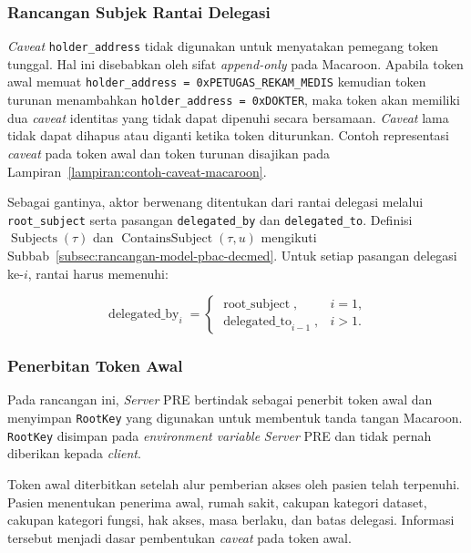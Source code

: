 \subsubsection{Rancangan Subjek Rantai Delegasi}

\textit{Caveat} \texttt{holder\_address} tidak digunakan untuk menyatakan pemegang token tunggal. Hal ini disebabkan oleh sifat \textit{append-only} pada Macaroon. Apabila token awal memuat \texttt{holder\_address = 0xPETUGAS\_REKAM\_MEDIS} kemudian token turunan menambahkan \texttt{holder\_address = 0xDOKTER}, maka token akan memiliki dua \textit{caveat} identitas yang tidak dapat dipenuhi secara bersamaan. \textit{Caveat} lama tidak dapat dihapus atau diganti ketika token diturunkan. Contoh representasi \textit{caveat} pada token awal dan token turunan disajikan pada Lampiran~\ref{lampiran:contoh-caveat-macaroon}.

Sebagai gantinya, aktor berwenang ditentukan dari rantai delegasi melalui \texttt{root\_subject} serta pasangan \texttt{delegated\_by} dan \texttt{delegated\_to}. Definisi $\operatorname{Subjects}(\tau)$ dan $\operatorname{ContainsSubject}(\tau,u)$ mengikuti Subbab~\ref{subsec:rancangan-model-pbac-decmed}. Untuk setiap pasangan delegasi ke-$i$, rantai harus memenuhi:

\begin{equation}
	\operatorname{delegated\_by}_{i}
	=
	\begin{cases}
		\operatorname{root\_subject},
		 & i=1, \\
		\operatorname{delegated\_to}_{i-1},
		 & i>1.
	\end{cases}
\end{equation}

\subsubsection{Penerbitan Token Awal}

Pada rancangan ini, \textit{Server} PRE bertindak sebagai penerbit token awal dan menyimpan \texttt{RootKey} yang digunakan untuk membentuk tanda tangan Macaroon. \texttt{RootKey} disimpan pada \textit{environment variable} \textit{Server} PRE dan tidak pernah diberikan kepada \textit{client}.

Token awal diterbitkan setelah alur pemberian akses oleh pasien telah terpenuhi. Pasien menentukan penerima awal, rumah sakit, cakupan kategori dataset, cakupan kategori fungsi, hak akses, masa berlaku, dan batas delegasi. Informasi tersebut menjadi dasar pembentukan \textit{caveat} pada token awal.

